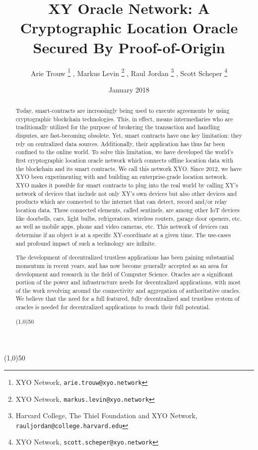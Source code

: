 \documentclass{article}
\title {XY Oracle Network: A Cryptographic Location Oracle Secured By Proof-of-Origin}
\author{
	Arie Trouw
		\thanks{XYO Network, \texttt{arie.trouw@xyo.network}}
	, Markus Levin
		\thanks{XYO Network, \texttt{markus.levin@xyo.network}}
	, Raul Jordan
		\thanks{Harvard College, The Thiel Foundation and XYO Network, \texttt{rauljordan@college.harvard.edu}}
	, Scott Scheper
		\thanks{XYO Network, \texttt{scott.scheper@xyo.network}}
}
\date{January 2018}
\begin{document}
\maketitle

\begin{center}
\line(1,0){50}
\end{center}



\begin{abstract}
Today, \glspl{smart-contract} are increasingly being used to execute agreements by using cryptographic blockchain technologies. This, in effect, means intermediaries who are traditionally utilized for the purpose of brokering the transaction and handling disputes, are fast-becoming obsolete. Yet, smart contracts have one key limitation: they rely on centralized data sources. Additionally, their application has thus far been confined to the online world. To solve this limitation, we have developed the world's first cryptographic location \gls{oracle} network which connects offline location data with the blockchain and its smart contracts. We call this network \Gls{XYO}. Since 2012, we have \Gls{XYO} been experimenting with and building an enterprise-grade location network. XYO makes it possible for smart contracts to plug into the real world by calling XY's network of devices that include not only XY's own devices but also other devices and products which are connected to the internet that can detect, record and/or relay location data. These connected elements, called \Glspl{sentinel}, are among other IoT devices like doorbells, cars, light bulbs, refrigerators, wireless routers, garage door openers, etc. as well as mobile apps,  phone and video cameras, etc. This network of devices can determine if an object is at a specific XY-coordinate at a given time. The use-cases and profound impact of such a technology are infinite.

The development of decentralized trustless applications has been gaining substantial momentum in recent years, and has now become generally accepted as an area for development and research in the field of Computer Science. Oracles are a significant portion of the power and infrastructure needs for decentralized applications, with most of the work revolving around the connectivity and aggregation of authoritative oracles. We believe that the need for a full featured, fully decentralized and trustless system of oracles is needed for decentralized applications to reach their full potential.

\begin{center}
\line(1,0){50}
\end{center}

\end{abstract}
\end{document}
